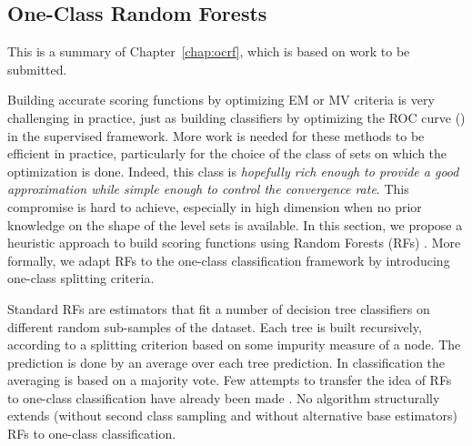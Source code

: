 \subsection{One-Class Random Forests}
\label{resume_fr:ocrf}
This is a summary of Chapter~\ref{chap:ocrf}, which is based on work \citep{OCRF16} to be submitted.


Building accurate scoring functions by optimizing EM or MV criteria is very challenging in practice, just as building classifiers by optimizing the ROC curve (\cite{Clemencon2010}) in the supervised framework.
%
More work is needed for these methods to be efficient in practice, particularly for the choice of the class of sets on which the optimization is done.
%
Indeed, %
this class is \emph{hopefully rich enough to provide a good approximation while simple enough to control the convergence rate}. This compromise is hard to achieve, especially in high dimension when no prior knowledge on the shape of the level sets is available. 
%
%
In this section, we propose a heuristic approach to build scoring functions using Random Forests (RFs) \citep{Breiman2001, Genuer2008, Biau2008, Biau2016}. %
More formally, we adapt RFs to the one-class classification framework by introducing one-class splitting criteria.

Standard RFs are estimators that fit a number of decision tree
classifiers on different random sub-samples of the dataset.
Each tree is built recursively, according to a splitting criterion based on
some impurity measure of a node. The prediction is done by an average over each tree prediction. In classification the averaging is based on a majority vote.
Few attempts to transfer the idea of RFs to one-class
classification have already been made \citep{Desir12, Liu2008, Shi2012}.
%
No algorithm structurally extends (without second class sampling and without alternative base estimators) RFs to one-class classification.

